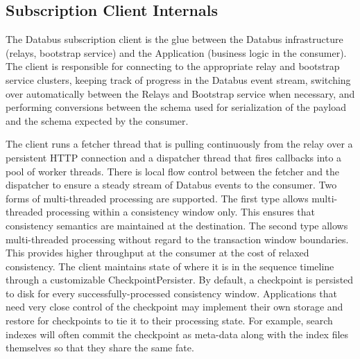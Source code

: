 \subsection{Subscription Client Internals}
The Databus subscription client is the glue between the Databus infrastructure (relays, bootstrap service) 
and the Application (business logic in the consumer). 
The client is responsible for connecting to the appropriate relay and bootstrap service clusters, keeping track of progress in the Databus event stream, switching over automatically between the Relays and Bootstrap service when necessary, and performing conversions between the schema used for serialization of the payload and the schema expected by the consumer. 

The client runs a fetcher thread that is pulling continuously from the relay over a persistent HTTP connection and a dispatcher thread that fires callbacks into a pool of worker threads. There is local flow control between the fetcher and the dispatcher to ensure a steady stream of Databus events to the consumer. Two forms of multi-threaded processing are supported. The first type allows multi-threaded processing within a consistency window only. This ensures that consistency semantics are maintained at the destination. The second type allows multi-threaded processing without regard to the transaction window boundaries. This provides higher throughput at the consumer at the cost of relaxed consistency. 
The client maintains state of where it is in the sequence timeline through a customizable CheckpointPersister. By default, a checkpoint is persisted to disk for every successfully-processed consistency window. Applications that need very close control of the checkpoint may implement their own storage and restore for checkpoints to tie it to their processing state. For example, search indexes will often commit the checkpoint as meta-data along with the index files themselves so that they share the same fate. 

